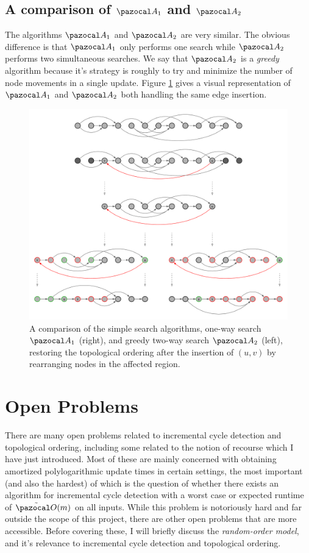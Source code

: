\documentclass{report}
\begin{document}
\subsection{A comparison of $\pazocal A_1$ and $\pazocal A_2$}

The algorithms $\pazocal A_1$ and $\pazocal A_2$ are very similar. The obvious difference is that $\pazocal A_1$ only performs one search while $\pazocal A_2$ performs two simultaneous searches. We say that $\pazocal A_2$ is a \textit{greedy} algorithm because it's strategy is roughly to try and minimize the number of node movements in a single update. Figure \ref{fig:simplesearch} gives a visual representation of $\pazocal A_1$ and $\pazocal A_2$ both handling the same edge insertion.

\begin{figure}[htp]
    \centering
    \centerline{\includegraphics[width=16cm]{Images/Simple Algos.png}}
    \caption{A comparison of the simple search algorithms, one-way search $\pazocal A_1$ (right), and greedy two-way search $\pazocal A_2$ (left), restoring the topological ordering after the insertion of $(u,v)$ by rearranging nodes in the affected region.}
    \label{fig:simplesearch}
\end{figure}

\section{Open Problems}

There are many open problems related to incremental cycle detection and topological ordering, including some related to the notion of recourse which I have just introduced. Most of these are mainly concerned with obtaining amortized polylogarithmic update times in certain settings, the most important (and also the hardest) of which is the question of whether there exists an algorithm for incremental cycle detection with a worst case or expected runtime of $\tilde{\pazocal O}(m)$ on all inputs. While this problem is notoriously hard and far outside the scope of this project, there are other open problems that are more accessible. Before covering these, I will briefly discuss the \textit{random-order model}, and it's relevance to incremental cycle detection and topological ordering.
\end{document}
